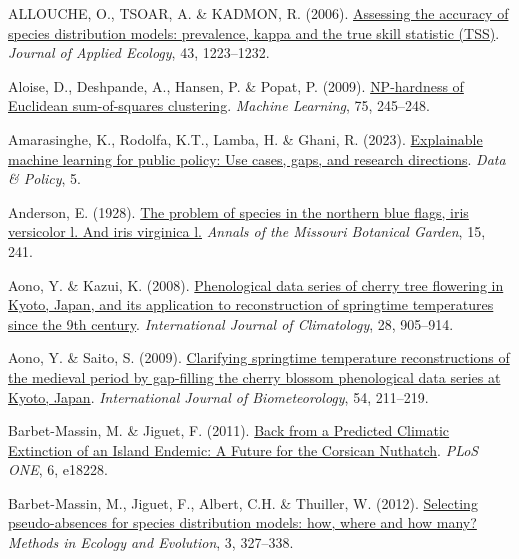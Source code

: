 \documentclass[
  letterpaper,
]{scrbook}
\newlength{\cslhangindent}
\newenvironment{CSLReferences}[2] %
 {\begin{list}{}{%
  \setlength{\itemindent}{0pt}
  \setlength{\leftmargin}{0pt}
  \setlength{\parsep}{0pt}
  \ifodd #1
   \setlength{\leftmargin}{\cslhangindent}
   \setlength{\itemindent}{-1\cslhangindent}
  \fi
  \setlength{\itemsep}{#2\baselineskip}}}
 {\end{list}}
\begin{document}
\label{refs}
\begin{CSLReferences}{1}{0}
ALLOUCHE, O., TSOAR, A. \& KADMON, R. (2006).
\href{https://doi.org/10.1111/j.1365-2664.2006.01214.x}{Assessing the
accuracy of species distribution models: prevalence, kappa and the true
skill statistic (TSS)}. \emph{Journal of Applied Ecology}, 43,
1223--1232.

Aloise, D., Deshpande, A., Hansen, P. \& Popat, P. (2009).
\href{https://doi.org/10.1007/s10994-009-5103-0}{NP-hardness of
Euclidean sum-of-squares clustering}. \emph{Machine Learning}, 75,
245--248.

Amarasinghe, K., Rodolfa, K.T., Lamba, H. \& Ghani, R. (2023).
\href{https://doi.org/10.1017/dap.2023.2}{Explainable machine learning
for public policy: Use cases, gaps, and research directions}. \emph{Data
\& Policy}, 5.

Anderson, E. (1928). \href{https://doi.org/10.2307/2394087}{The problem
of species in the northern blue flags, iris versicolor l. And iris
virginica l.} \emph{Annals of the Missouri Botanical Garden}, 15, 241.

Aono, Y. \& Kazui, K. (2008).
\href{https://doi.org/10.1002/joc.1594}{Phenological data series of
cherry tree flowering in Kyoto, Japan, and its application to
reconstruction of springtime temperatures since the 9th century}.
\emph{International Journal of Climatology}, 28, 905--914.

Aono, Y. \& Saito, S. (2009).
\href{https://doi.org/10.1007/s00484-009-0272-x}{Clarifying springtime
temperature reconstructions of the medieval period by gap-filling the
cherry blossom phenological data series at Kyoto, Japan}.
\emph{International Journal of Biometeorology}, 54, 211--219.

Barbet-Massin, M. \& Jiguet, F. (2011).
\href{https://doi.org/10.1371/journal.pone.0018228}{Back from a
Predicted Climatic Extinction of an Island Endemic: A Future for the
Corsican Nuthatch}. \emph{PLoS ONE}, 6, e18228.

Barbet-Massin, M., Jiguet, F., Albert, C.H. \& Thuiller, W. (2012).
\href{https://doi.org/10.1111/j.2041-210x.2011.00172.x}{Selecting
pseudo-absences for species distribution models: how, where and how
many?} \emph{Methods in Ecology and Evolution}, 3, 327--338.


\end{CSLReferences}
\end{document}
